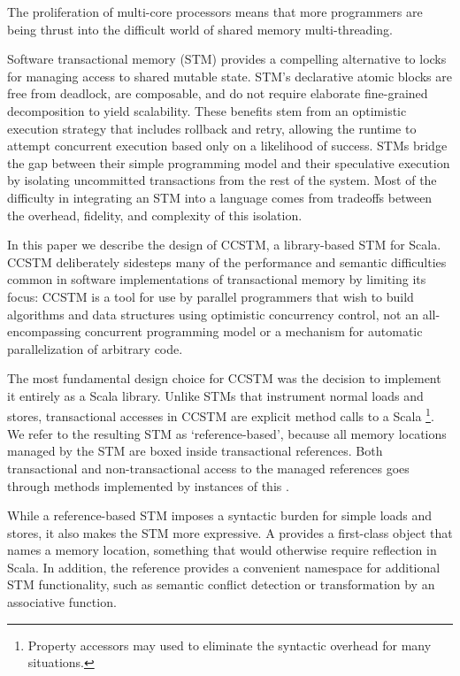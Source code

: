 The proliferation of multi-core processors means that more programmers are
being thrust into the difficult world of shared memory multi-threading.

Software transactional memory (STM) provides a compelling alternative to
locks for managing access to shared mutable state.  STM's declarative
atomic blocks are free from deadlock, are composable, and do not
require elaborate fine-grained decomposition to yield scalability.
These benefits stem from an optimistic execution strategy that includes
rollback and retry, allowing the runtime to attempt concurrent execution
based only on a likelihood of success.  STMs bridge the gap between their
simple programming model and their speculative execution by isolating
uncommitted transactions from the rest of the system.  Most of the
difficulty in integrating an STM into a language comes from tradeoffs
between the overhead, fidelity, and complexity of this isolation.

In this paper we describe the design of CCSTM, a library-based STM for
Scala.  CCSTM deliberately sidesteps many of the performance and semantic
difficulties common in software implementations of transactional memory
by limiting its focus: CCSTM is a tool for use by parallel programmers
that wish to build algorithms and data structures using optimistic
concurrency control, not an all-encompassing concurrent programming
model or a mechanism for automatic parallelization of arbitrary code.

The most fundamental design choice for CCSTM was the decision to
implement it entirely as a Scala library.  Unlike STMs that instrument
normal loads and stores, transactional accesses in CCSTM are explicit
method calls to a Scala \footnote{Property accessors
may used to eliminate the syntactic overhead for many situations.}.
We refer to the resulting STM as `reference-based', because all memory
locations managed by the STM are boxed inside transactional references.
Both transactional and non-transactional access to the managed references
goes through methods implemented by instances of this .

While a reference-based STM imposes a syntactic burden for simple loads and
stores, it also makes the STM more expressive.  A  provides
a first-class object that names a memory location, something that would
otherwise require reflection in Scala.  In addition, the reference provides a
convenient namespace for additional STM functionality, such as semantic
conflict detection or transformation by an associative function.

